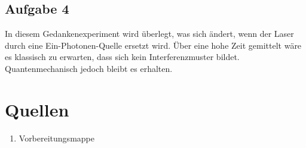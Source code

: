 \documentclass[a4paper,ngerman]{scrartcl}
\begin{document}
\subsection{Aufgabe 4}

In diesem Gedankenexperiment wird überlegt, was sich ändert, wenn der Laser durch eine Ein-Photonen-Quelle ersetzt wird. Über eine hohe Zeit gemittelt wäre es klassisch zu erwarten, dass sich kein Interferenzmuster bildet. Quantenmechanisch jedoch bleibt es erhalten.



\clearpage
\section{Quellen}
\begin{enumerate}
\item Vorbereitungsmappe \label{ref:mappe}
\end{enumerate}
\end{document}
